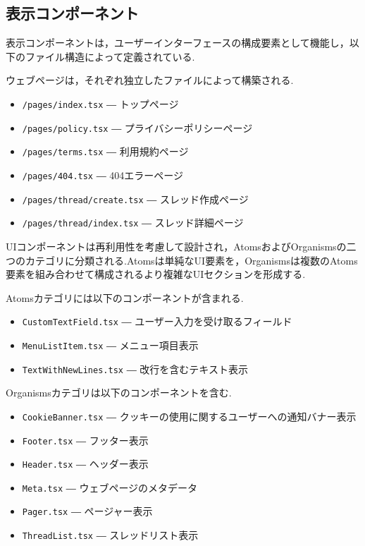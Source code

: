 \documentclass[b5paper,12pt,dvipdfmx]{jsreport}
\begin{document}
\subsection*{表示コンポーネント}

表示コンポーネントは，ユーザーインターフェースの構成要素として機能し，以下のファイル構造によって定義されている.

ウェブページは，それぞれ独立したファイルによって構築される.

\begin{itemize}
\item \texttt{/pages/index.tsx} ― トップページ
\item \texttt{/pages/policy.tsx} ― プライバシーポリシーページ
\item \texttt{/pages/terms.tsx} ― 利用規約ページ
\item \texttt{/pages/404.tsx} ― 404エラーページ
\item \texttt{/pages/thread/create.tsx} ― スレッド作成ページ
\item \texttt{/pages/thread/index.tsx} ― スレッド詳細ページ
\end{itemize}

UIコンポーネントは再利用性を考慮して設計され，AtomsおよびOrganismsの二つのカテゴリに分類される.Atomsは単純なUI要素を，Organismsは複数のAtoms要素を組み合わせて構成されるより複雑なUIセクションを形成する.

Atomsカテゴリには以下のコンポーネントが含まれる.

\begin{itemize}
    \item \texttt{CustomTextField.tsx} ― ユーザー入力を受け取るフィールド
    \item \texttt{MenuListItem.tsx} ― メニュー項目表示
    \item \texttt{TextWithNewLines.tsx} ― 改行を含むテキスト表示
\end{itemize}

Organismsカテゴリは以下のコンポーネントを含む.

\begin{itemize}
    \item \texttt{CookieBanner.tsx} ― クッキーの使用に関するユーザーへの通知バナー表示
    \item \texttt{Footer.tsx} ― フッター表示
    \item \texttt{Header.tsx} ― ヘッダー表示
    \item \texttt{Meta.tsx} ― ウェブページのメタデータ
    \item \texttt{Pager.tsx} ― ページャー表示
    \item \texttt{ThreadList.tsx} ― スレッドリスト表示
\end{itemize}
\end{document}
